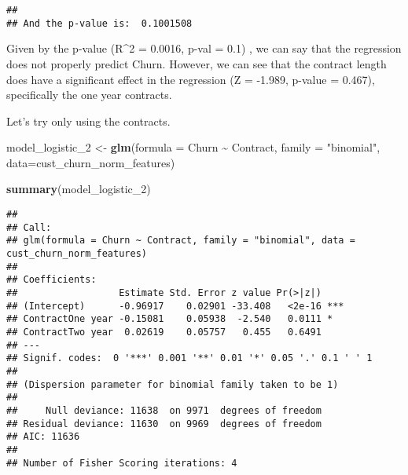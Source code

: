 \documentclass[
]{article}
\newenvironment{Shaded}{\begin{snugshade}}{\end{snugshade}}
\newcommand{\AttributeTok}[1]{\textcolor[rgb]{0.13,0.29,0.53}{#1}}
\newcommand{\DecValTok}[1]{\textcolor[rgb]{0.00,0.00,0.81}{#1}}
\newcommand{\FunctionTok}[1]{\textcolor[rgb]{0.13,0.29,0.53}{\textbf{#1}}}
\newcommand{\NormalTok}[1]{#1}
\newcommand{\OtherTok}[1]{\textcolor[rgb]{0.56,0.35,0.01}{#1}}
\newcommand{\SpecialCharTok}[1]{\textcolor[rgb]{0.81,0.36,0.00}{\textbf{#1}}}
\newcommand{\StringTok}[1]{\textcolor[rgb]{0.31,0.60,0.02}{#1}}
\begin{document}
\begin{Shaded}
\end{Shaded}

\begin{verbatim}
## 
## And the p-value is:  0.1001508
\end{verbatim}

Given by the p-value (R\^{}2 = 0.0016, p-val = 0.1) , we can say that
the regression does not properly predict Churn. However, we can see that
the contract length does have a significant effect in the regression (Z
= -1.989, p-value = 0.467), specifically the one year contracts.

Let's try only using the contracts.

\begin{Shaded}
\begin{Highlighting}[]
\NormalTok{model\_logistic\_2 }\OtherTok{\textless{}{-}} \FunctionTok{glm}\NormalTok{(}\AttributeTok{formula =}\NormalTok{ Churn }\SpecialCharTok{\textasciitilde{}}\NormalTok{ Contract, }\AttributeTok{family =} \StringTok{"binomial"}\NormalTok{, }\AttributeTok{data=}\NormalTok{cust\_churn\_norm\_features)}

\FunctionTok{summary}\NormalTok{(model\_logistic\_2)}
\end{Highlighting}
\end{Shaded}

\begin{verbatim}
## 
## Call:
## glm(formula = Churn ~ Contract, family = "binomial", data = cust_churn_norm_features)
## 
## Coefficients:
##                  Estimate Std. Error z value Pr(>|z|)    
## (Intercept)      -0.96917    0.02901 -33.408   <2e-16 ***
## ContractOne year -0.15081    0.05938  -2.540   0.0111 *  
## ContractTwo year  0.02619    0.05757   0.455   0.6491    
## ---
## Signif. codes:  0 '***' 0.001 '**' 0.01 '*' 0.05 '.' 0.1 ' ' 1
## 
## (Dispersion parameter for binomial family taken to be 1)
## 
##     Null deviance: 11638  on 9971  degrees of freedom
## Residual deviance: 11630  on 9969  degrees of freedom
## AIC: 11636
## 
## Number of Fisher Scoring iterations: 4
\end{verbatim}
\end{document}
